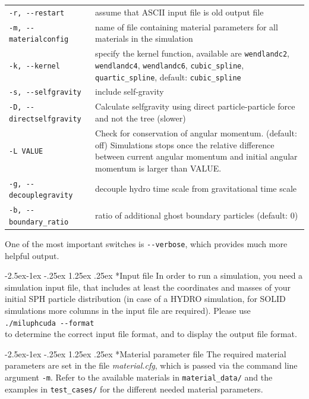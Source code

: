 \documentclass[10pt,fleqn,twoside]{article}
\makeatletter
\renewcommand\paragraph{\@startsection{paragraph}{4}{\z@}%
            {-2.5ex\@plus -1ex \@minus -.25ex}%
            {1.25ex \@plus .25ex}%
            {\normalfont\normalsize\bfseries}}
\makeatother
\begin{document}
\begin{table}
\begin{tabular}[b]{p{5cm} p{9cm}}
\verb|-r, --restart|		&	assume that ASCII input file is old output file	\\
\verb|-m, --materialconfig|		&	name of file containing material parameters for all materials in the simulation		\\
\verb|-k, --kernel|		&	specify the kernel function, available are \verb|wendlandc2|, \verb|wendlandc4|, \verb|wendlandc6|, \verb|cubic_spline|, \verb|quartic_spline|, default: \verb|cubic_spline|		\\
\verb|-s, --selfgravity|	&	include self-gravity		\\
\verb|-D, --directselfgravity| & 	Calculate selfgravity using direct particle-particle force and not the tree (slower) \\
\verb|-L VALUE| &  Check for conservation of angular momentum. (default: off)
    Simulations stops once the relative difference between current angular momentum and initial
    angular momentum is larger than VALUE. \\
\verb|-g, --decouplegravity|	&	decouple hydro time scale from gravitational time scale	\\
\verb|-b, --boundary_ratio|	&	ratio of additional ghost boundary particles (default: 0)	\\
\hline
\end{tabular}
\label{tab:cmd-line-options}
\end{table}

One of the most important switches is \verb|--verbose|, which provides much more helpful output.


\paragraph*{Input file}
In order to run a simulation, you need a simulation input file, that includes at least the coordinates and masses of your initial SPH particle distribution (in case of a HYDRO simulation, for SOLID simulations more columns in the input file are required).
Please use\\
\verb|./miluphcuda --format|\\
to determine the correct input file format, and to display the output file format.


\paragraph*{Material parameter file}
The required material parameters are set in the file \emph{material.cfg}, which is passed via the command line argument \verb|-m|. Refer to the available materials in \verb|material_data/| and the examples in \verb|test_cases/| for the different needed material parameters.
\end{document}
